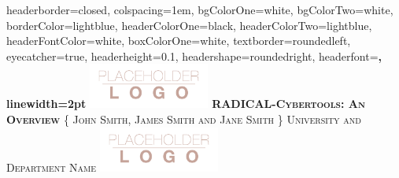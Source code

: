 \documentclass[landscape,a0paper,fontscale=0.285]{baposter} %
\begin{document}
\begin{poster}
{
headerborder=closed, %
colspacing=1em, %
bgColorOne=white, %
bgColorTwo=white, %
borderColor=lightblue, %
headerColorOne=black, %
headerColorTwo=lightblue, %
headerFontColor=white, %
boxColorOne=white, %
textborder=roundedleft, %
eyecatcher=true, %
headerheight=0.1\textheight, %
headershape=roundedright, %
headerfont=\Large\bf\textsc, %
linewidth=2pt %
}
%
{\includegraphics[height=4em]{logo.png}} %
{\bf\textsc{RADICAL-Cybertools: An Overview}\vspace{0.5em}} %
{\textsc{\{ John Smith, James Smith and Jane Smith \} \hspace{12pt} University and Department Name}} %
{\includegraphics[height=4em]{logo.png}} %



\end{poster}
\end{document}

